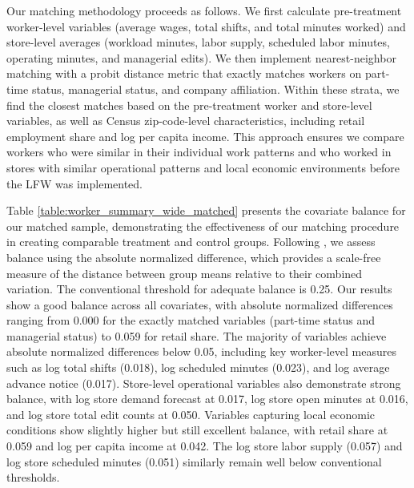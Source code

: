 \documentclass[letterpaper,11pt,leqno]{article}
\theoremstyle{paper}
\begin{document}
Our matching methodology proceeds as follows. We first calculate pre-treatment worker-level variables (average wages, total shifts, and total minutes worked) and store-level averages (workload minutes, labor supply, scheduled labor minutes, operating minutes, and managerial edits). We then implement nearest-neighbor matching with a probit distance metric that exactly matches workers on part-time status, managerial status, and company affiliation. Within these strata, we find the closest matches based on the pre-treatment worker and store-level variables, as well as Census zip-code-level characteristics, including retail employment share and log per capita income. This approach ensures we compare workers who were similar in their individual work patterns and who worked in stores with similar operational patterns and local economic environments before the LFW was implemented.

Table \ref{table:worker_summary_wide_matched} presents the covariate balance for our matched sample, demonstrating the effectiveness of our matching procedure in creating comparable treatment and control groups. Following \cite{imbens2015causal}, we assess balance using the absolute normalized difference, which provides a scale-free measure of the distance between group means relative to their combined variation. The conventional threshold for adequate balance is 0.25. Our results show a good balance across all covariates, with absolute normalized differences ranging from 0.000 for the exactly matched variables (part-time status and managerial status) to 0.059 for retail share. The majority of variables achieve absolute normalized differences below 0.05, including key worker-level measures such as log total shifts (0.018), log scheduled minutes (0.023), and log average advance notice (0.017). Store-level operational variables also demonstrate strong balance, with log store demand forecast at 0.017, log store open minutes at 0.016, and log store total edit counts at 0.050. Variables capturing local economic conditions show slightly higher but still excellent balance, with retail share at 0.059 and log per capita income at 0.042. The log store labor supply (0.057) and log store scheduled minutes (0.051) similarly remain well below conventional thresholds. 
\end{document}
